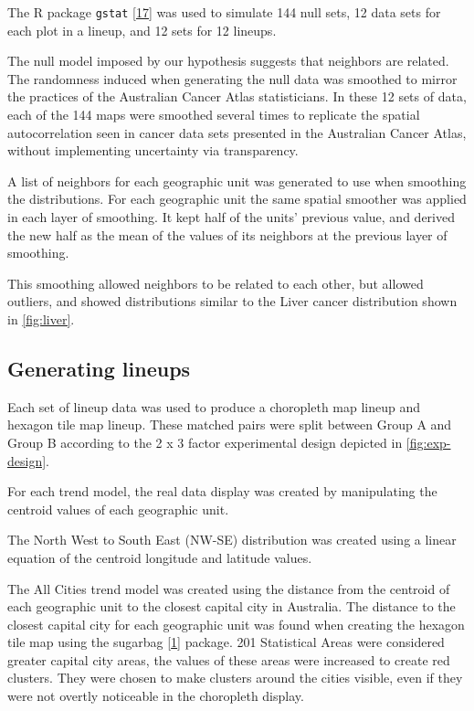\documentclass[conference,final,]{IEEEtran}
\begin{document}
The R package \texttt{gstat} {[}\protect\hyperlink{ref-gstat}{17}{]} was used to simulate 144 null sets, 12 data sets for each plot in a lineup, and 12 sets for 12 lineups.

The null model imposed by our hypothesis suggests that neighbors are related. The randomness induced when generating the null data was smoothed to mirror the practices of the Australian Cancer Atlas statisticians.
In these 12 sets of data, each of the 144 maps were smoothed several times to replicate the spatial autocorrelation seen in cancer data sets presented in the Australian Cancer Atlas, without implementing uncertainty via transparency.

A list of neighbors for each geographic unit was generated to use when smoothing the distributions. For each geographic unit the same spatial smoother was applied in each layer of smoothing. It kept half of the units' previous value, and derived the new half as the mean of the values of its neighbors at the previous layer of smoothing.

This smoothing allowed neighbors to be related to each other, but allowed outliers, and showed distributions similar to the Liver cancer distribution shown in \ref{fig:liver}.

\hypertarget{generating-lineups}{%
\subsection{Generating lineups}\label{generating-lineups}}

Each set of lineup data was used to produce a choropleth map lineup and hexagon tile map lineup. These matched pairs were split between Group A and Group B according to the 2 x 3 factor experimental design depicted in \ref{fig:exp-design}.

For each trend model, the real data display was created by manipulating the centroid values of each geographic unit.

The North West to South East (NW-SE) distribution was created using a linear equation of the centroid longitude and latitude values.

The All Cities trend model was created using the distance from the centroid of each geographic unit to the closest capital city in Australia. The distance to the closest capital city for each geographic unit was found when creating the hexagon tile map using the sugarbag {[}\protect\hyperlink{ref-sugarbag}{1}{]} package.
201 Statistical Areas were considered greater capital city areas, the values of these areas were increased to create red clusters. They were chosen to make clusters around the cities visible, even if they were not overtly noticeable in the choropleth display.
\end{document}
